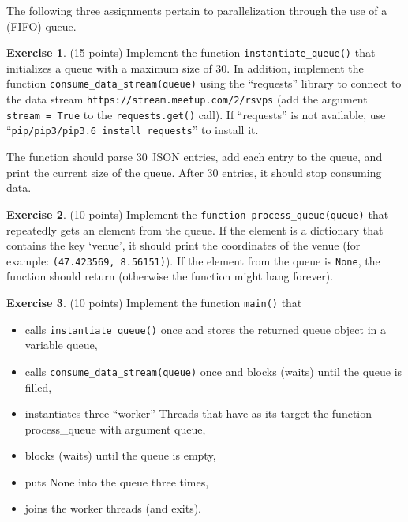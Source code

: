 \documentclass[a4paper]{report}
\theoremstyle{definition}
\newtheorem{exercise}{Exercise}
\begin{document}
	\noindent The following three assignments pertain to parallelization through the use of a (FIFO) queue.
	
	\begin{exercise}
		(15 points) Implement the function \texttt{instantiate\_queue()} that initializes a queue with a maximum size of 30. In addition, implement the function \texttt{consume\_data\_stream(queue)} using the “requests” library to connect to the data stream \texttt{https://stream.meetup.com/2/rsvps} (add the argument \texttt{stream = True} to the \texttt{requests.get()} call). If “requests” is not available, use “\texttt{pip/pip3/pip3.6 install requests}” to install it.
		
		The function should parse 30 JSON entries, add each entry to the queue,	and print the current size of the queue. After 30 entries, it should stop consuming data.
	\end{exercise}
	
	\begin{exercise}
		(10 points) Implement the \texttt{\small function process\_queue(queue)} that repeatedly gets an element from the queue. If the element is a dictionary that contains the key ‘venue’, it should print the coordinates of the venue (for example: \texttt{(47.423569, 8.56151)}). If the element from the queue is \texttt{None}, the function should return (otherwise the function might hang forever).
	\end{exercise}
	
	\begin{exercise}
		(10 points) Implement the function \texttt{main()} that
		
		\begin{itemize}
			\item calls \texttt{instantiate\_queue()} once and stores the returned queue object in a variable queue,
			\item calls \texttt{consume\_data\_stream(queue)} once and blocks (waits) until the queue is filled,
			\item instantiates three “worker” Threads that have as its target the function process\_queue with argument queue,
			\item blocks (waits) until the queue is empty,
			\item puts None into the queue three times,
			\item joins the worker threads (and exits).
		\end{itemize}
	\end{exercise}
	
\end{document}
